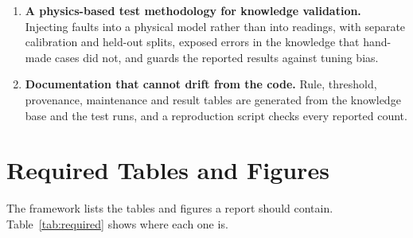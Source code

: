 \begin{enumerate}
  \item \textbf{A physics-based test methodology for knowledge validation.} Injecting faults into a physical model rather than into readings, with separate calibration and held-out splits, exposed errors in the knowledge that hand-made cases did not, and guards the reported results against tuning bias.
  \item \textbf{Documentation that cannot drift from the code.} Rule, threshold, provenance, maintenance and result tables are generated from the knowledge base and the test runs, and a reproduction script checks every reported count.
\end{enumerate}

\section{Required Tables and Figures}
\label{sec:tables-figures}

The framework lists the tables and figures a report should contain. Table~\ref{tab:required} shows where each one is.

